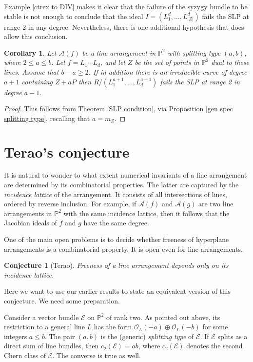 \documentclass[12pt]{amsart}
\numberwithin{equation}{section}
\newtheorem{corollary}[theorem]{Corollary}
\newtheorem{conjecture}[theorem]{Conjecture}
\theoremstyle{definition}
\begin{document}
Example \ref{ctrex to DIV} makes it clear that the failure of the syzygy bundle to be stable is not enough to conclude that the ideal $I = (L_1^d,\dots,L_{|Z|}^d)$ fails the SLP at range 2 in any degree. Nevertheless, there is one additional hypothesis that does allow this conclusion.

\begin{corollary} \label{explain DIV}
Let $\mathcal A(f)$ be a line arrangement in $\mathbb P^2$ with splitting type $(a,b)$, where $2 \le a \le b$. Let $f = L_1\cdots L_d$, and let $Z$ be the set of points in $\mathbb P^2$ dual to these lines.  Assume that   $b-a \geq 2$. 
If in addition there is an irreducible curve of degree $a+1$ containing $Z+aP$ then $R/(L_1^{a+1},\dots,L_d^{a+1})$ fails the SLP at range 2 in degree $a-1$. 
\end{corollary}  

\begin{proof}
This follows from Theorem \ref{SLP condition}, via Proposition \ref{gen spec splitting type}, recalling that $a = m_Z$.
\end{proof}

\section{Terao's conjecture} 
\label{sec:Terao}

It is natural to wonder to what extent numerical invariants of a line arrangement are determined by its combinatorial properties. The latter are captured by the \emph{incidence lattice} of the arrangement. It consists of all intersections of lines, ordered by reverse inclusion.  For example, if $\mathcal{A} (f)$ and $\mathcal{A} (g)$  are two line arrangements in ${ \ensuremath{\mathbb{P}}}^2$ with the same incidence lattice, then it follows that the Jacobian ideals of $f$ and $g$ have the same degree. 

One of the main open problems is to decide whether freeness of hyperplane arrangements is a combinatorial property. It is open even for line arrangements. 

\begin{conjecture}[Terao]
    \label{conj:Terao} 
Freeness of a line arrangement  depends  only on its incidence lattice. 
\end{conjecture}

Here we want to use our earlier results to state an equivalent version of this conjecture. We need some preparation. 

Consider a vector bundle $\mathcal{E}$ on ${ \ensuremath{\mathbb{P}}}^2$ of rank two. As pointed out above, its restriction to a general line $L$ has the form 
$\mathcal{O}_L(-a) \oplus \mathcal{O}_L(-b)$ for some integers $a\leq b$. The pair $(a, b)$ is the (generic) \emph{splitting type} of ${\mathcal{E}}$. If $\mathcal E$ splits as a direct sum of line bundles,  then $c_2 ({\mathcal{E}}) = ab$, where $c_2 ({\mathcal{E}})$ denotes the second Chern class of ${\mathcal{E}}$. The converse is true as well. 
\end{document}
